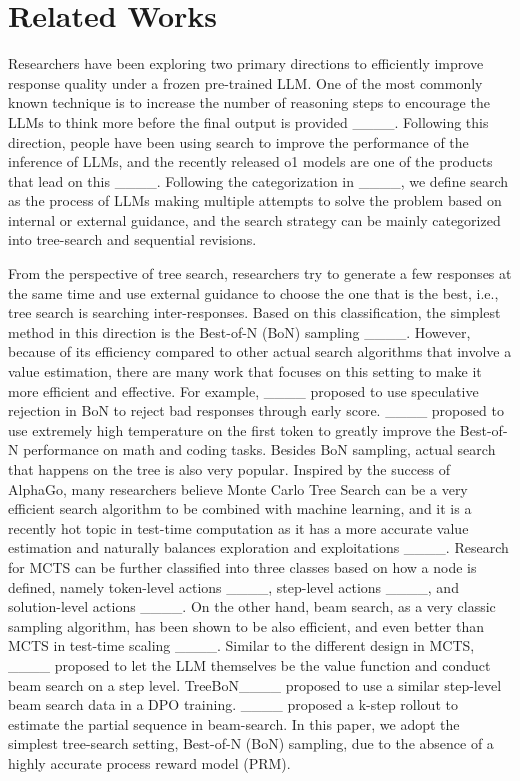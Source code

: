 \section{Related Works}
Researchers have been exploring two primary directions to efficiently improve response quality under a frozen pre-trained LLM. 
One of the most commonly known technique is to increase the number of reasoning steps to encourage the LLMs to think more before the final output is provided ____. Following this direction, people have been using search to improve the performance of the inference of LLMs, and the recently released o1 models are one of the products that lead on this ____. Following the categorization in ____, we define search as the process of LLMs making multiple attempts to solve the problem based on internal or external guidance, and the search strategy can be mainly categorized into tree-search and sequential revisions.

From the perspective of tree search, researchers try to generate a few responses at the same time and use external guidance to choose the one that is the best, i.e., tree search is searching inter-responses. Based on this classification, the simplest method in this direction is the Best-of-N (BoN) sampling ____. However, because of its efficiency compared to other actual search algorithms that involve a value estimation, there are many work that focuses on this setting to make it more efficient and effective. For example, ____ proposed to use speculative rejection in BoN to reject bad responses through early score. ____ proposed to use extremely high temperature on the first token to greatly improve the Best-of-N performance on math and coding tasks. 
Besides BoN sampling, actual search that happens on the tree is also very popular. 
Inspired by the success of AlphaGo, many researchers believe Monte Carlo Tree Search can be a very efficient search algorithm to be combined with machine learning, and it is a recently hot topic in test-time computation as it has a more accurate value estimation and naturally balances exploration and exploitations ____. Research for MCTS can be further classified into three classes based on how a node is defined, namely token-level actions ____, step-level actions ____, and solution-level actions ____.  
On the other hand, beam search, as a very classic sampling algorithm, has been shown to be also efficient, and even better than MCTS in test-time scaling ____. 
Similar to the different design in MCTS, ____ proposed to let the LLM themselves be the value function and conduct beam search on a step level. 
TreeBoN____ proposed to use a similar step-level beam search data in a DPO training. 
____ proposed a k-step rollout to estimate the partial sequence in beam-search. 
In this paper, we adopt the simplest tree-search setting, Best-of-N (BoN) sampling, due to the absence of a highly accurate process reward model (PRM).

